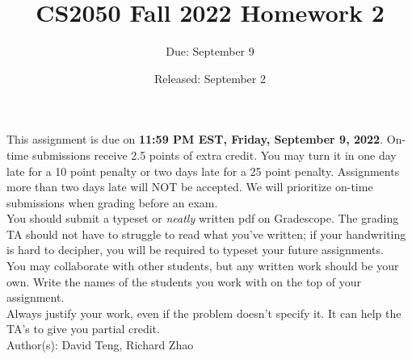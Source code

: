 \documentclass{article}
\title{CS2050 Fall 2022 Homework 2}
\author{Due: September 9}
\date{Released: September 2}
\begin{document}
\maketitle

This assignment is due on \textbf{11:59 PM EST, Friday, September 9, 2022}.  On-time submissions receive 2.5 points of extra credit. You may turn it in one day late for a 10 point penalty or two days late for a 25 point penalty. Assignments more than two days late will NOT be accepted.  We will prioritize on-time submissions when grading before an exam. \\ 

You should submit a typeset or \emph{neatly} written pdf on Gradescope.  The grading TA should not have to struggle to read what you've written; if your handwriting is hard to decipher, you will be required to typeset your future assignments.\\ 

You may collaborate with other students, but any written work should be your own. Write the names of the students you work with on the top of your assignment.\\

Always justify your work, even if the problem doesn't specify it. It can help the TA's to give you partial credit.
\\

Author(s): David Teng, Richard Zhao

\clearpage
\end{document}

